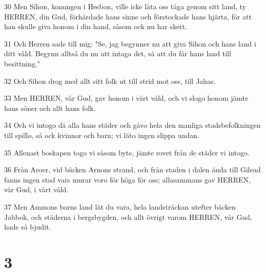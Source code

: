 \par 30 Men Sihon, konungen i Hesbon, ville icke låta oss tåga genom sitt land, ty HERREN, din Gud, förhärdade hans sinne och förstockade hans hjärta, för att han skulle giva honom i din hand, såsom ock nu har skett.
\par 31 Och Herren sade till mig: "Se, jag begynner nu att giva Sihon och hans land i ditt våld. Begynn alltså du nu att intaga det, så att du får hans land till besittning."
\par 32 Och Sihon drog med allt sitt folk ut till strid mot oss, till Jahas.
\par 33 Men HERREN, vår Gud, gav honom i vårt våld, och vi slogo honom jämte hans söner och allt hans folk.
\par 34 Och vi intogo då alla hans städer och gåvo hela den manliga stadsbefolkningen till spillo, så ock kvinnor och barn; vi läto ingen slippa undan.
\par 35 Allenast boskapen togo vi såsom byte, jämte rovet från de städer vi intogo.
\par 36 Från Aroer, vid bäcken Arnons strand, och från staden i dalen ända till Gilead fanns ingen stad vars murar voro för höga för oss; allasammans gav HERREN, vår Gud, i vårt våld.
\par 37 Men Ammons barns land lät du vara, hela landsträckan utefter bäcken Jabbok, och städerna i bergsbygden, och allt övrigt varom HERREN, vår Gud, hade så bjudit.

\chapter{3}

